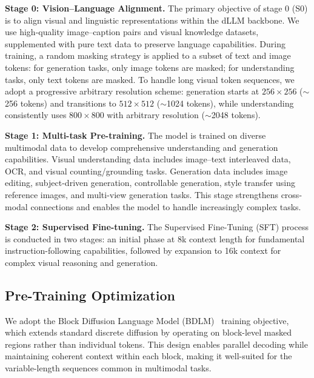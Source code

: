 \noindent
\textbf{Stage 0: Vision–Language Alignment.} 
The primary objective of stage 0 (S0) is to align visual and linguistic representations within the dLLM backbone.
We use high-quality image–caption pairs and visual knowledge datasets, supplemented with pure text data to preserve language capabilities.
During training, a random masking strategy is applied to a subset of text and image tokens: for generation tasks, only image tokens are masked; for understanding tasks, only text tokens are masked.
To handle long visual token sequences, we adopt a progressive arbitrary resolution scheme: generation starts at $256 \times 256$ ($\sim$256 tokens) and transitions to $512 \times 512$ ($\sim$1024 tokens), while understanding consistently uses $800 \times 800$ with arbitrary resolution ($\sim$2048 tokens).



\noindent
\textbf{Stage 1: Multi-task Pre-training.} 
The model is trained on diverse multimodal data to develop comprehensive understanding and generation capabilities.
%
Visual understanding data includes image–text interleaved data, OCR, and visual counting/grounding tasks. 
Generation data includes image editing, subject-driven generation, controllable generation, style transfer using reference images, and multi-view generation tasks. 
%
This stage strengthens cross-modal connections and enables the model to handle increasingly complex tasks.

\noindent
\textbf{Stage 2: Supervised Fine-tuning.}
The Supervised Fine-Tuning (SFT) process is conducted in two stages: an initial phase at 8k context length for fundamental instruction-following capabilities, followed by expansion to 16k context for complex visual reasoning and generation.


\subsection{Pre-Training Optimization}
We adopt the Block Diffusion Language Model (BDLM)~\citep{arriola2025block} training objective, which extends standard discrete diffusion by operating on block-level masked regions rather than individual tokens.
%
This design enables parallel decoding while maintaining coherent context within each block, making it well-suited for the variable-length sequences common in multimodal tasks.

